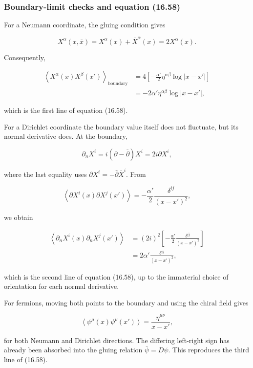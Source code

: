 \documentclass[
  10pt,
  a4paper,
  openany]{book}
\begin{document}
\subsubsection{Boundary-limit checks and equation
(16.58)}\label{boundary-limit-checks-and-equation-16.58}

For a Neumann coordinate, the gluing condition gives

\[
X^\alpha(x,\bar x)
=X^\alpha(x)+\bar X^\alpha(x)
=2X^\alpha(x).
\]

Consequently,

\[
\begin{aligned}
\left\langle X^\alpha(x)X^\beta(x')\right\rangle_{\mathrm{boundary}}
&=4\left[-\frac{\alpha'}2\eta^{\alpha\beta}\log|x-x'|\right]\\
&=-2\alpha'\eta^{\alpha\beta}\log|x-x'|,
\end{aligned}
\]

which is the first line of equation (16.58).

For a Dirichlet coordinate the boundary value itself does not fluctuate,
but its normal derivative does. At the boundary,

\[
\partial_nX^i
=i(\partial-\bar\partial)X^i
=2i\partial X^i,
\]

where the last equality uses \(\partial X^i=-\bar\partial\bar X^i\).
From

\[
\left\langle\partial X^i(x)\partial X^j(x')\right\rangle
=-\frac{\alpha'}2
\frac{\delta^{ij}}{(x-x')^2},
\]

we obtain

\[
\begin{aligned}
\left\langle\partial_nX^i(x)\partial_nX^j(x')\right\rangle
&=(2i)^2
\left[-\frac{\alpha'}2
\frac{\delta^{ij}}{(x-x')^2}\right]\\
&=2\alpha'
\frac{\delta^{ij}}{(x-x')^2},
\end{aligned}
\]

which is the second line of equation (16.58), up to the immaterial
choice of orientation for each normal derivative.

For fermions, moving both points to the boundary and using the chiral
field gives

\[
\left\langle\psi^\mu(x)\psi^\nu(x')\right\rangle
=\frac{\eta^{\mu\nu}}{x-x'},
\]

for both Neumann and Dirichlet directions. The differing left-right sign
has already been absorbed into the gluing relation \(\bar\psi=D\psi\).
This reproduces the third line of (16.58).
\end{document}
